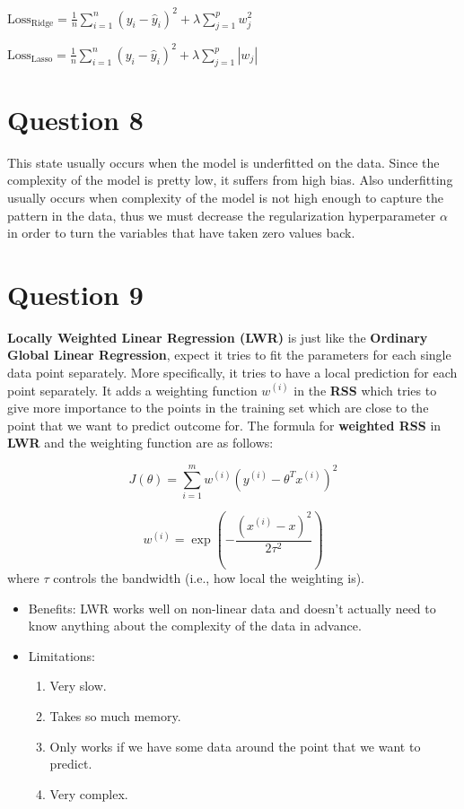 \documentclass[a4paper,12pt]{article}
\begin{document}
\(
\text{Loss}_{\text{Ridge}} = \frac{1}{n} \sum_{i=1}^{n} (y_i - \hat{y}_i)^2 + \lambda \sum_{j=1}^{p} w_j^2
\)

\(
\text{Loss}_{\text{Lasso}} = \frac{1}{n} \sum_{i=1}^{n} (y_i - \hat{y}_i)^2 + \lambda \sum_{j=1}^{p} |w_j|
\)

\section*{Question 8}
This state usually occurs when the model is underfitted on the data. Since the complexity of the model is pretty low, it suffers from high bias. Also underfitting usually occurs when complexity of the model is not high enough
to capture the pattern in the data, thus we must decrease the regularization hyperparameter $ \alpha $ in order to turn the variables that have taken zero values back.

\section*{Question 9}
\textbf{Locally Weighted Linear Regression (LWR)} is just like the \textbf{Ordinary Global Linear Regression}, expect it tries to fit the parameters for each single data point separately. 
More specifically, it tries to have a local prediction for each point separately. It adds a weighting function $ w^(i) $ in the \textbf{RSS} which tries to give more importance to the points 
in the training set which are close to the point that we want to predict outcome for. The formula for \textbf{weighted RSS} in \textbf{LWR} and the weighting function are as follows:

\[
J(\theta) = \sum_{i=1}^m w^{(i)} \left( y^{(i)} - \theta^T x^{(i)} \right)^2
\]  

\[
w^{(i)} = \exp\left( -\frac{(x^{(i)} - x)^2}{2\tau^2} \right)
\]
where \( \tau \) controls the bandwidth (i.e., how local the weighting is).

\begin{itemize}
    \item Benefits: LWR works well on non-linear data and doesn't actually need to know anything about the complexity of the data in advance.
    \item Limitations: 
    \begin{enumerate}
        \item Very slow.
        \item Takes so much memory.
        \item Only works if we have some data around the point that we want to predict.
        \item Very complex.
    \end{enumerate}
\end{itemize}
\end{document}
